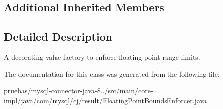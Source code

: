 \subsection*{Additional Inherited Members}


\subsection{Detailed Description}
A decorating value factory to enforce floating point range limits. 

The documentation for this class was generated from the following file\+:\begin{DoxyCompactItemize}
\item 
pruebas/mysql-\/connector-\/java-\/8../src/main/core-\/impl/java/com/mysql/cj/result/Floating\+Point\+Bounds\+Enforcer.\+java\end{DoxyCompactItemize}
